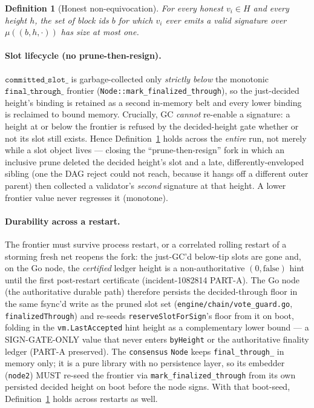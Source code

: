 \documentclass[11pt]{article}
\newtheorem{definition}{Definition}
\begin{document}
\begin{definition}[Honest non-equivocation]\label{def:nonequiv}
For every honest $v_i\in H$ and every height $h$, the set of block ids $b$ for which
$v_i$ ever emits a valid signature over $\mu((b,h,\cdot))$ has size at most one.
\end{definition}

\paragraph{Slot lifecycle (no prune-then-resign).}
$\texttt{committed\_slot\_}$ is garbage-collected only \emph{strictly below} the monotonic
$\texttt{final\_through\_}$ frontier (\texttt{Node::mark\_finalized\_through}), so the
just-decided height's binding is retained as a second in-memory belt and every lower
binding is reclaimed to bound memory. Crucially, GC \emph{cannot} re-enable a signature:
a height at or below the frontier is refused by the decided-height gate whether or not its
slot still exists. Hence Definition~\ref{def:nonequiv} holds across the \emph{entire} run,
not merely while a slot object lives --- closing the ``prune-then-resign'' fork in which an
inclusive prune deleted the decided height's slot and a late, differently-enveloped sibling
(one the DAG reject could not reach, because it hangs off a different outer parent) then
collected a validator's \emph{second} signature at that height. A lower frontier value
never regresses it (monotone).

\paragraph{Durability across a restart.}
The frontier must survive process restart, or a correlated rolling restart of a storming
fresh net reopens the fork: the just-GC'd below-tip slots are gone and, on the Go node, the
\emph{certified} ledger height is a non-authoritative $(0,\text{false})$ hint until the
first post-restart certificate (incident-1082814 PART-A). The Go node (the authoritative
durable path) therefore persists the decided-through floor in the same fsync'd write as the
pruned slot set (\texttt{engine/chain/vote\_guard.go}, \texttt{finalizedThrough}) and
re-seeds \texttt{reserveSlotForSign}'s floor from it on boot, folding in the
\texttt{vm.LastAccepted} hint height as a complementary lower bound --- a SIGN-GATE-ONLY
value that never enters \texttt{byHeight} or the authoritative finality ledger (PART-A
preserved). The \texttt{consensus} \texttt{Node} keeps \texttt{final\_through\_} in memory
only; it is a pure library with no persistence layer, so its embedder (\texttt{node2}) MUST
re-seed the frontier via \texttt{mark\_finalized\_through} from its own persisted decided
height on boot before the node signs. With that boot-seed, Definition~\ref{def:nonequiv}
holds across restarts as well.
\end{document}
